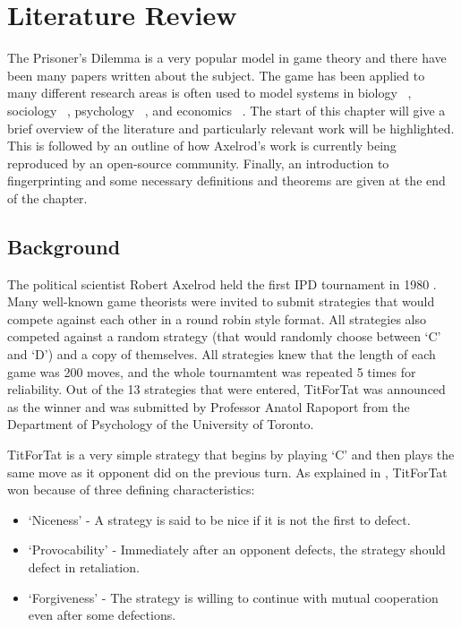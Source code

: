 
\chapter{Literature Review}\label{cha:literature_review}

The Prisoner's Dilemma is a very popular model in game theory and there have been many papers written about the subject.
The game has been applied to many different research areas is often used to model systems in biology ~\cite{Sigmund1999}, sociology ~\cite{Franken2005}, psychology ~\cite{Ishibuchi2005}, and economics ~\cite{Chong2005}.
The start of this chapter will give a brief overview of the literature and particularly relevant work will be highlighted.
This is followed by an outline of how Axelrod's work is currently being reproduced by an open-source community.
Finally, an introduction to fingerprinting and some necessary definitions and theorems are given at the end of the chapter.


\section{Background}\label{sec:axelrodoriginal}

The political scientist Robert Axelrod held the first IPD tournament in 1980 \cite{Axelrod1980a}.
Many well-known game theorists were invited to submit strategies that would compete against each other in a round robin style format.
All strategies also competed against a random strategy (that would randomly choose between `C' and `D') and a copy of themselves.
All strategies knew that the length of each game was 200 moves, and the whole tournamtent was repeated 5 times for reliability.
Out of the 13 strategies that were entered, TitForTat was announced as the winner and was submitted by Professor Anatol Rapoport from the Department of Psychology of the University of Toronto.

TitForTat is a very simple strategy that begins by playing `C' and then plays the same move as it opponent did on the previous turn.
As explained in \cite{Axelrod1980b}, TitForTat won because of three defining characteristics:

\begin{itemize}
    \item `Niceness' - A strategy is said to be nice if it is not the first to defect.
    \item `Provocability' - Immediately after an opponent defects, the strategy should defect in retaliation.
    \item `Forgiveness' - The strategy is willing to continue with mutual cooperation even after some defections.
\end{itemize}

